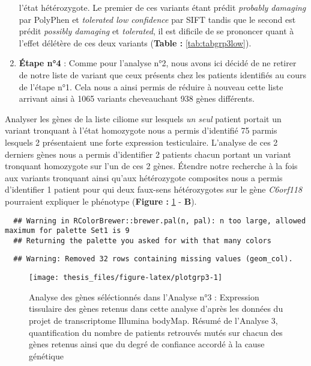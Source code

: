 \documentclass[12pt,twoside]{reedthesis}
\theoremstyle{definition}
\theoremstyle{definition}
\theoremstyle{remark}
\begin{document}
\begin{enumerate}
    l'état hétérozygote. Le premier de ces variants étant prédit
    \emph{probably damaging} par PolyPhen et \emph{tolerated low
    confidence} par SIFT tandis que le second est prédit \emph{possibly
    damaging} et \emph{tolerated}, il est dificile de se prononcer quant à
    l'effet délétère de ces deux variants (\textbf{Table :}
    \ref{tab:tabgrp3low}).
  \item
    \textbf{Étape n°4} : Comme pour l'analyse n°2, nous avons ici décidé
    de ne retirer de notre liste de variant que ceux présents chez les
    patients identifiés au cours de l'étape n°1. Cela nous a ainsi permis
    de réduire à nouveau cette liste arrivant ainsi à 1065 variants
    cheveauchant 938 gènes différents.
  \end{enumerate}
  
  Analyser les gènes de la liste ciliome sur lesquels \emph{un seul}
  patient portait un variant tronquant à l'état homozygote nous a permis
  d'identifié 75 parmis lesquels 2 présentaient une forte expression
  testiculaire. L'analyse de ces 2 derniers gènes nous a permis
  d'identifier 2 patients chacun portant un variant tronquant homozygote
  sur l'un de ces 2 gènes. Étendre notre recherche à la fois aux variants
  tronquant ainsi qu'aux hétérozygote composites nous a permis
  d'identifier 1 patient pour qui deux faux-sens hétérozygotes sur le gène
  \emph{C6orf118} pourraient expliquer le phénotype (\textbf{Figure :}
  \ref{fig:plotgrp3} - \textbf{B}).
  
  \newpage  
  
  \begin{verbatim}
  ## Warning in RColorBrewer::brewer.pal(n, pal): n too large, allowed maximum for palette Set1 is 9
  ## Returning the palette you asked for with that many colors
  \end{verbatim}
  
  \begin{verbatim}
  ## Warning: Removed 32 rows containing missing values (geom_col).
  \end{verbatim}
  
  \begin{figure}
  
  {\centering \texttt{[image: thesis\_files/figure-latex/plotgrp3-1]} 
  
  }
  
  \caption[Analyse des gènes séléctionnés dans l'Analyse n°3]{Analyse des gènes séléctionnés dans l'Analyse n°3 : Expression tissulaire des gènes retenus dans cette analyse d'après les données du projet de transcriptome Illumina bodyMap. Résumé de l'Analyse 3, quantification du nombre de patients retrouvés mutés sur chacun des gènes retenus ainsi que du degré de confiance accordé à la cause génétique}\label{fig:plotgrp3}
  \end{figure}
  
\end{document}
